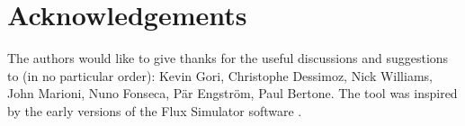 \section{Acknowledgements}
The authors would like to give thanks for the useful discussions and suggestions to (in no particular order):
Kevin Gori, Christophe Dessimoz, Nick Williams, John Marioni, Nuno Fonseca, P\"ar Engstr\"om, Paul Bertone. The \rlsim tool
was inspired by the early versions of the Flux Simulator software \cite{griebel12}.
